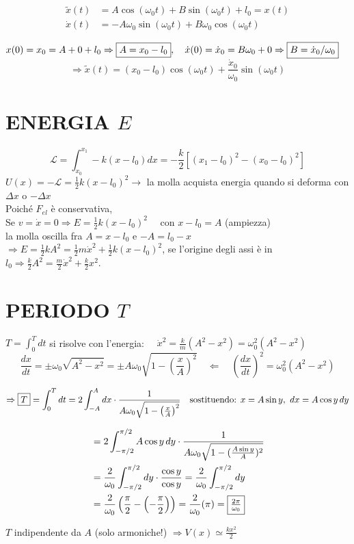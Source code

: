 \documentclass[12pt]{article}
\begin{document}
\begin{align*}
\tilde{x}(t) &= A\cos(\omega_0 t) + B\sin(\omega_0 t) + l_0 = x(t) \\
\dot{x}(t) &= -A\omega_0\sin(\omega_0 t) + B\omega_0\cos(\omega_0 t)
\end{align*}

$x(0) = x_0 = A + 0 + l_0 \Rightarrow \fbox{$A = x_0 - l_0$}, \quad \dot{x}(0) = \dot{x}_0 = B\omega_0 + 0 \Rightarrow \fbox{$B = \dot{x}_0/\omega_0$}$
$$ \Rightarrow \tilde{x}(t) = (x_0 - l_0)\cos(\omega_0 t) + \frac{\dot{x}_0}{\omega_0}\sin(\omega_0 t) $$

\section*{ENERGIA $E$}
$$ \mathcal{L} = \int_{x_0}^{x_1} -k(x-l_0)dx = -\frac{k}{2} [ (x_1 - l_0)^2 - (x_0 - l_0)^2 ] $$
$U(x) = -\mathcal{L} = \frac{1}{2} k (x-l_0)^2 \to$ la molla acquista energia quando si deforma con $\Delta x$ o $-\Delta x$ \\
Poiché $F_{el}$ è conservativa,
 \\
Se $v = \dot{x} = 0 \Rightarrow E = \frac{1}{2} k (x-l_0)^2 \quad$ con $x-l_0 = A$ (ampiezza) \\
la molla oscilla fra $A = x-l_0$ e $-A = l_0-x$ \\
$\Rightarrow E = \frac{1}{2} k A^2 = \frac{1}{2} m \dot{x}^2 + \frac{1}{2} k (x-l_0)^2$, se l'origine degli assi è in $l_0 \Rightarrow \frac{k}{2}A^2 = \frac{m}{2}\dot{x}^2 + \frac{k}{2}x^2$.

\section*{PERIODO $T$}
$T = \int_0^T dt$ si risolve con l'energia: $\quad \dot{x}^2 = \frac{k}{m} (A^2 - x^2) = \omega_0^2(A^2 - x^2)$ \\
$$ \frac{dx}{dt} = \pm \omega_0 \sqrt{A^2 - x^2} = \pm A \omega_0 \sqrt{1 - \left(\frac{x}{A}\right)^2} \quad \Leftarrow \quad \left(\frac{dx}{dt}\right)^2 = \omega_0^2(A^2 - x^2) $$

$$ \Rightarrow \fbox{$T$} = \int_0^T dt = 2 \int_{-A}^A dx \cdot \frac{1}{A\omega_0\sqrt{1-\left(\frac{x}{A}\right)^2}} \quad \text{sostituendo: } x = A\sin y, \ dx = A\cos y \, dy $$

\begin{align*}
&= 2 \int_{-\pi/2}^{\pi/2} A\cos y \, dy \cdot \frac{1}{A\omega_0\sqrt{1-(\frac{A\sin y}{A})^2}} \\
&= \frac{2}{\omega_0} \int_{-\pi/2}^{\pi/2} dy \cdot \frac{\cos y}{\cos y} = \frac{2}{\omega_0} \int_{-\pi/2}^{\pi/2} dy \\
&= \frac{2}{\omega_0} \left(\frac{\pi}{2} - \left(-\frac{\pi}{2}\right)\right) = \frac{2}{\omega_0}(\pi) = \fbox{$\frac{2\pi}{\omega_0}$}
\end{align*}

$T$ indipendente da $A$ (solo armoniche!) $\Rightarrow V(x) \simeq \frac{k x^2}{2}$
\end{document}
